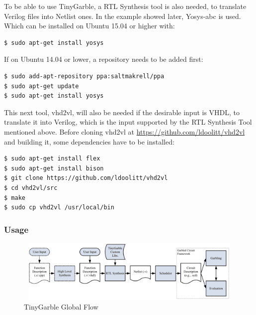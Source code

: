\begin{refsection}
To be able to use TinyGarble, a RTL Synthesis tool is also needed, to translate Verilog files into Netlist ones. In the example showed later, Yosys-abc is used. Which can be installed on Ubuntu 15.04 or higher with:

\begin{lstlisting}[caption={Installation of Yosys-abc for Ubuntu 15.04>}, language=bash, captionpos=b]
$ sudo apt-get install yosys
\end{lstlisting}

If on Ubuntu 14.04 or lower, a repository needs to be added first:

\begin{lstlisting}[caption={Installation of Yosys-abc for Ubuntu 14.04<}, language=bash, captionpos=b]
$ sudo add-apt-repository ppa:saltmakrell/ppa
$ sudo apt-get update
$ sudo apt-get install yosys
\end{lstlisting}

This next tool, vhd2vl, will also be needed if the desirable input is VHDL, to translate it into Verilog, which is the input supported by the RTL Synthesis Tool mentioned above.
Before cloning vhd2vl at \url{https://github.com/ldoolitt/vhd2vl} and building it, some dependencies have to be installed:

\begin{lstlisting}[caption={Installation of VHD2VL}, language=bash, captionpos=b]
$ sudo apt-get install flex
$ sudo apt-get install bison
$ git clone https://github.com/ldoolitt/vhd2vl
$ cd vhd2vl/src
$ make
$ sudo cp vhd2vl /usr/local/bin
\end{lstlisting}

\newpage

\subsubsection{Usage}

\begin{figure}[H]
	\centering
	\includegraphics[width=1\textwidth, height=3cm]{./sdf/secure_multiparty_computation/figures/tiny_garble_flow.png}
    \caption{TinyGarble Global Flow\cite{Songhori}}\label{fig:tinygarble_flow}
\end{figure}


\end{refsection}
